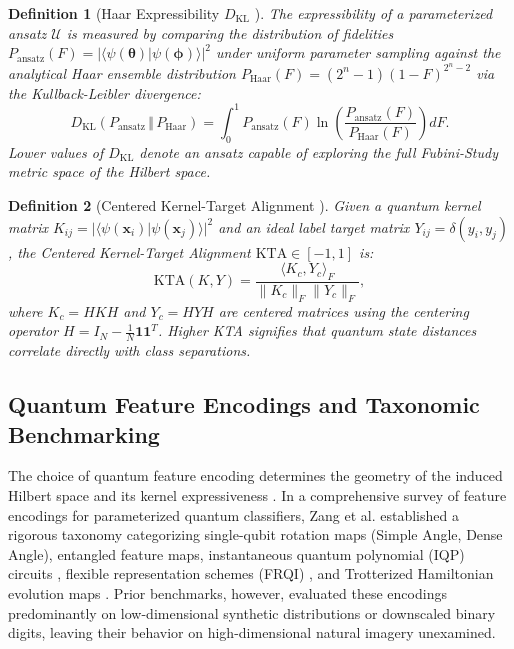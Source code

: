 \documentclass[10pt,twocolumn,twoside,a4paper]{article}
\newcommand{\braket}[2]{\langle#1|#2\rangle}
\newtheorem{definition}{Definition}
\begin{document}
\begin{definition}[Haar Expressibility $D_{\text{KL}}$ \cite{sim2019expressibility}]
The expressibility of a parameterized ansatz $\mathcal{U}$ is measured by comparing the distribution of fidelities $P_{\text{ansatz}}(F) = |\braket{\psi(\boldsymbol{\theta})}{\psi(\boldsymbol{\phi})}|^2$ under uniform parameter sampling against the analytical Haar ensemble distribution $P_{\text{Haar}}(F) = (2^n - 1)(1 - F)^{2^n - 2}$ via the Kullback-Leibler divergence:
\begin{equation}
    D_{\text{KL}}\left( P_{\text{ansatz}} \,\Vert\, P_{\text{Haar}} \right) = \int_0^1 P_{\text{ansatz}}(F) \ln \left( \frac{P_{\text{ansatz}}(F)}{P_{\text{Haar}}(F)} \right) dF.
\end{equation}
Lower values of $D_{\text{KL}}$ denote an ansatz capable of exploring the full Fubini-Study metric space of the Hilbert space.
\end{definition}

\begin{definition}[Centered Kernel-Target Alignment \cite{cortes2012algorithms, hubregtsen2021systematic}]
Given a quantum kernel matrix $K_{ij} = |\braket{\psi(\mathbf{x}_i)}{\psi(\mathbf{x}_j)}|^2$ and an ideal label target matrix $Y_{ij} = \delta(y_i, y_j)$, the Centered Kernel-Target Alignment $\text{KTA} \in [-1, 1]$ is:
\begin{equation}
    \text{KTA}(K, Y) = \frac{\langle K_c, Y_c \rangle_F}{\|K_c\|_F \|Y_c\|_F},
    \label{eq:kta_def}
\end{equation}
where $K_c = H K H$ and $Y_c = H Y H$ are centered matrices using the centering operator $H = I_N - \frac{1}{N}\mathbf{1}\mathbf{1}^T$. Higher KTA signifies that quantum state distances correlate directly with class separations.
\end{definition}

\subsection{Quantum Feature Encodings and Taxonomic Benchmarking}
The choice of quantum feature encoding determines the geometry of the induced Hilbert space and its kernel expressiveness \cite{schuld2019quantum, schuld2021effect}. In a comprehensive survey of feature encodings for parameterized quantum classifiers, Zang et al. \cite{zang2025comprehensive} established a rigorous taxonomy categorizing single-qubit rotation maps (Simple Angle, Dense Angle), entangled feature maps, instantaneous quantum polynomial (IQP) circuits \cite{havlicek2019supervised}, flexible representation schemes (FRQI) \cite{le2011flexible}, and Trotterized Hamiltonian evolution maps \cite{hamiltonian2025benchmark}. Prior benchmarks, however, evaluated these encodings predominantly on low-dimensional synthetic distributions or downscaled binary digits, leaving their behavior on high-dimensional natural imagery unexamined.
\end{document}
